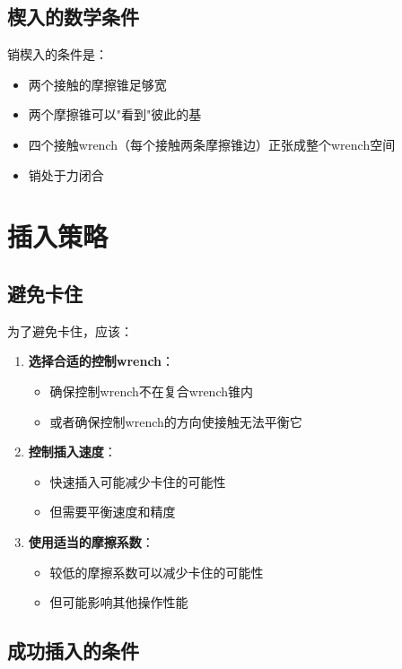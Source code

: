 \documentclass[12pt,a4paper]{article}
\begin{document}
\subsection{楔入的数学条件}

销楔入的条件是：
\begin{itemize}
    \item 两个接触的摩擦锥足够宽
    \item 两个摩擦锥可以"看到"彼此的基
    \item 四个接触wrench（每个接触两条摩擦锥边）正张成整个wrench空间
    \item 销处于力闭合
\end{itemize}

\section{插入策略}

\subsection{避免卡住}

为了避免卡住，应该：

\begin{enumerate}
    \item \textbf{选择合适的控制wrench}：
    \begin{itemize}
        \item 确保控制wrench不在复合wrench锥内
        \item 或者确保控制wrench的方向使接触无法平衡它
    \end{itemize}
    
    \item \textbf{控制插入速度}：
    \begin{itemize}
        \item 快速插入可能减少卡住的可能性
        \item 但需要平衡速度和精度
    \end{itemize}
    
    \item \textbf{使用适当的摩擦系数}：
    \begin{itemize}
        \item 较低的摩擦系数可以减少卡住的可能性
        \item 但可能影响其他操作性能
    \end{itemize}
\end{enumerate}

\subsection{成功插入的条件}
\end{document}
